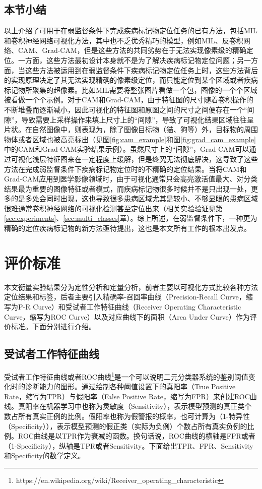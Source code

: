 \subsection{本节小结}\label{subsec:related_work_summary}
以上介绍了可用于在弱监督条件下完成疾病标记物定位任务的已有方法，包括MIL和卷积神经网络可视化方法，其中也不乏优秀精巧的模型，例如MIL、反卷积网络、CAM、Grad-CAM，但是这些方法的共同劣势在于无法实现像素级的精确定位。一方面，这些方法最初设计本身就不是为了解决疾病标记物定位问题；另一方面，当这些方法被运用到在弱监督条件下疾病标记物定位任务上时，这些方法背后的实现原理决定了其无法实现精确的像素级定位，而只能定位到某个区域或者疾病标记物所聚集的超像素。比如MIL需要将整张图片看做一个包，图像的一个个区域被看做一个个示例。对于CAM和Grad-CAM，由于特征图的尺寸随着卷积操作的不断堆叠而逐渐减小，因此可视化的特征图和原图之间的尺寸之间便存在一个“间隙”，导致需要上采样操作来填上尺寸上的“间隙”，导致了可视化结果区域往往呈片状。在自然图像中，则表现为，除了图像目标物（猫、狗等）外，目标物的周围物体或者区域也被高亮标出（见图\ref{fig:cam_example}和图\ref{fig:grad_cam_example}中的CAM和Grad-CAM实验结果示例）。虽然尺寸上的“间隙”，Grad-CAM可以通过可视化浅层特征图来在一定程度上缓解，但是终究无法彻底解决，这导致了这些方法在完成弱监督条件下疾病标记物定位时的不精确的定位结果。当将CAM和Grad-CAM应用到医学影像领域时，由于可视化通常只会高亮激活值最大、对分类结果最为重要的图像特征或者模式，而疾病标记物很多时候并不是只出现一处，更多的是多处会同时出现，这也导致很多患病区域尤其是较小、不够显眼的患病区域很难通常卷积神经网络的可视化检测甚至定位出来（相关实验验证见第\ref{sec:experiments}、\ref{sec:multi_classes}章）。综上所述，在弱监督条件下，一种更为精确的定位疾病标记物的新方法亟待提出，这也是本文所有工作的根本出发点。
\section{评价标准}
本文衡量实验结果分为定性分析和定量分析，前者主要以可视化方式比较各种方法定位结果和标签，后者主要引入精确率-召回率曲线（Precision-Recall Curve，缩写为P-R Curve）和受试者工作特征曲线（Receiver Operating Characteristic Curve，缩写为ROC Curve）以及对应曲线下的面积（Area Under Curve）作为评价标准。下面分别进行介绍。
\subsection{受试者工作特征曲线}\label{subsec:roc_curve}
受试者工作特征曲线或者ROC曲线\footnote{https://en.wikipedia.org/wiki/Receiver\_operating\_characteristic}是一个可以说明二元分类器系统的鉴别阈值变化时的诊断能力的图形。通过绘制各种阈值设置下的真阳率（True Positive Rate，缩写为TPR）与假阳率（False Positive Rate，缩写为FPR）来创建ROC曲线。真阳率在机器学习中也称为灵敏度（Sensitivity），表示模型预测的真正类个数占所有真实正例的比例。假阳率也称为假警报的概率，也可计算为（1-特异性（Specificity）），表示模型预测的假正类（实际为负例）个数占所有真实负例的比例。ROC曲线是以TPR作为衰减的函数。换句话说，ROC曲线的横轴是FPR或者（1-Specificity），纵轴是TPR或者Sensitivity。下面给出TPR、FPR、Sensitivity和Specificity的数学定义。


